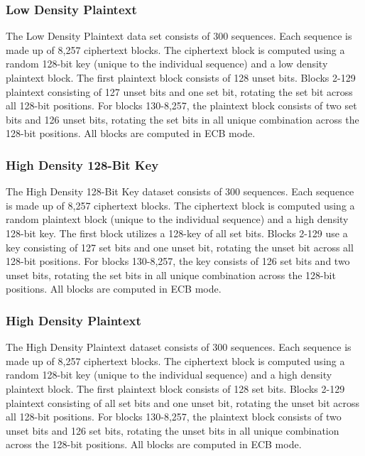 \documentclass[conference]{IEEEtran}
\begin{document}
\subsubsection{Low Density Plaintext}

The Low Density Plaintext data set consists of 300 sequences. Each sequence is made up of 8,257 ciphertext blocks. The ciphertext block is computed using a random 128-bit key (unique to the individual sequence) and a low density plaintext block. The first plaintext block consists of 128 unset bits. Blocks 2-129 plaintext consisting of 127 unset bits and one set bit, rotating the set bit across all 128-bit positions. For blocks 130-8,257, the plaintext block consists of two set bits and 126 unset bits, rotating the set bits in all unique combination across the 128-bit positions. All blocks are computed in ECB mode.

\subsubsection{High Density 128-Bit Key}

The High Density 128-Bit Key dataset consists of 300 sequences. Each sequence is made up of 8,257 ciphertext blocks. The ciphertext block is computed using a random plaintext block (unique to the individual sequence) and a high density 128-bit key. The first block utilizes a 128-key of all set bits. Blocks 2-129 use a key consisting of 127 set bits and one unset bit, rotating the unset bit across all 128-bit 	positions. For blocks 130-8,257, the key consists of 126 set bits and two unset bits, rotating the set bits in all unique combination across the 128-bit positions. All blocks are computed in ECB mode.

\subsubsection{High Density Plaintext}
The High Density Plaintext dataset consists of 300 sequences. Each sequence is made up of 8,257 ciphertext blocks. The ciphertext block is computed using a random 128-bit key (unique to the individual sequence) and a high density plaintext block. The first plaintext block consists of 128 set bits. Blocks 2-129 plaintext consisting of all set bits and one unset bit, rotating the unset bit across all 128-bit positions. For blocks 130-8,257, the plaintext block consists of two unset bits and 126 set bits, rotating the unset bits in all unique combination across the 128-bit positions. All blocks are computed in ECB mode.
\end{document}
